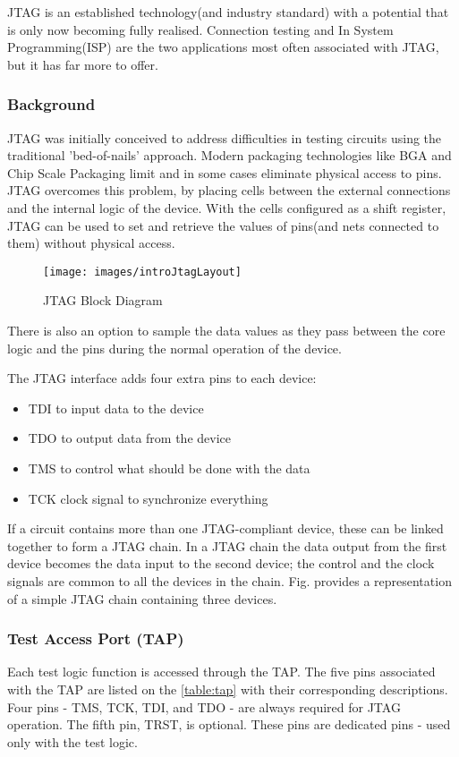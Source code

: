 \documentclass[a4paper,11pt]{article}
\begin{document}
JTAG is an established technology(and industry standard) with a potential that is only now becoming fully realised. Connection testing and In System Programming(ISP) are the two applications most often associated with JTAG, but it has far more to offer.
\subsubsection{Background}
JTAG was initially conceived to address difficulties in testing circuits using the traditional 'bed-of-nails' approach. Modern packaging technologies like BGA and Chip Scale Packaging limit and in some cases eliminate physical access to pins.
JTAG overcomes this problem, by placing cells between the external connections and the internal logic of the device. With the cells configured as a shift register, JTAG can be used to set and retrieve the values of pins(and nets connected to them) without physical access.

\begin{figure}[ht]
\centering
\texttt{[image: images/introJtagLayout]}
\caption{JTAG Block Diagram \cite{xjtag2}}
\end{figure}

There is also an option to sample the data values as they pass between the core logic and the pins during the normal operation of the device.

The JTAG interface adds four extra pins to each device:
\begin{itemize}[noitemsep]
\item TDI to input data to the device
\item TDO to output data from the device
\item TMS to control what should be done with the data
\item TCK clock signal to synchronize everything
\end{itemize}

If a circuit contains more than one JTAG-compliant device, these can be linked together to form a JTAG chain. In a JTAG chain the data output from the first device becomes the data input to the second device; the control and the clock signals are common to all the devices in the chain. Fig. provides a representation of a simple JTAG chain containing three devices.


\subsubsection{Test Access Port (TAP)}
Each test logic function is accessed through the TAP. The five pins associated with the TAP are listed on the \ref{table:tap} with their corresponding descriptions. Four pins - TMS, TCK, TDI, and TDO - are always required for JTAG operation. The fifth pin, TRST, is optional. These pins are dedicated pins - used only with the test logic. 
\end{document}
